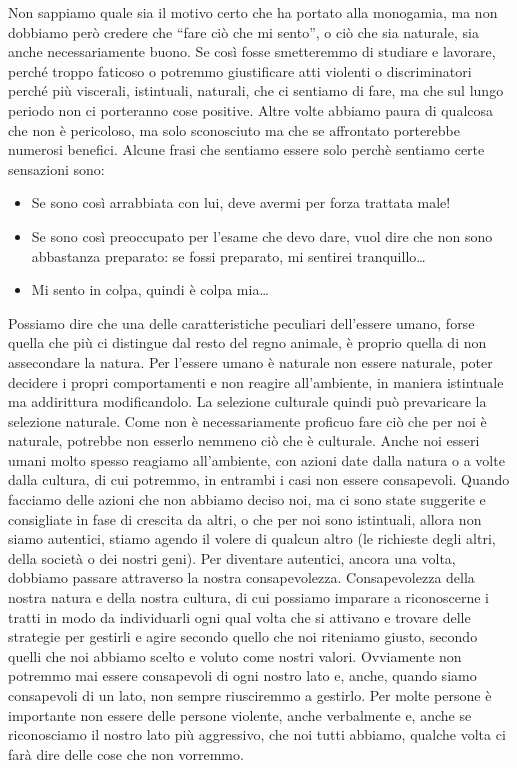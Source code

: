 \documentclass[12pt]{book} %
\begin{document}
Non sappiamo quale sia il motivo certo che ha portato alla monogamia, ma non dobbiamo però
credere che “fare ciò che mi sento”, o ciò che sia naturale, sia anche necessariamente buono. Se
così fosse smetteremmo di studiare e lavorare, perché troppo faticoso o potremmo giustificare atti violenti o
discriminatori perché più viscerali, istintuali, naturali, che ci sentiamo di fare,
ma che sul lungo periodo non ci porteranno cose positive. Altre volte abbiamo paura di qualcosa che non è
pericoloso, ma solo sconosciuto ma che se affrontato porterebbe numerosi benefici. 
Alcune frasi che sentiamo essere solo perchè sentiamo certe sensazioni sono:
\begin{itemize}
\item Se sono così arrabbiata con lui, deve avermi per forza trattata male! 
\item Se sono così preoccupato per l'esame che devo dare, vuol dire che non sono abbastanza preparato: se fossi preparato, mi sentirei tranquillo…
\item Mi sento in colpa, quindi è colpa mia…
\end{itemize}

Possiamo dire che una delle caratteristiche peculiari dell'essere umano, forse quella che più ci
distingue dal resto del regno animale, è proprio quella di non assecondare la natura. Per l'essere
umano è naturale non essere naturale, poter decidere i propri comportamenti e non reagire
all'ambiente, in maniera istintuale ma addirittura modificandolo. La selezione culturale quindi
può prevaricare la selezione naturale. Come non è necessariamente proficuo fare ciò che per noi è naturale, potrebbe non esserlo
nemmeno ciò che è culturale. Anche noi esseri umani molto spesso reagiamo
all'ambiente, con azioni date dalla natura o a volte dalla cultura, di cui potremmo, in entrambi i
casi non essere consapevoli. Quando facciamo delle azioni che non abbiamo deciso noi, ma ci sono state suggerite e
consigliate in fase di crescita da altri, o che per noi sono istintuali, allora non siamo autentici, stiamo agendo il
volere di qualcun altro (le richieste degli altri, della società o dei nostri geni). Per diventare autentici, ancora
una volta, dobbiamo passare attraverso la nostra consapevolezza. Consapevolezza della nostra natura e della nostra
cultura, di cui possiamo imparare a riconoscerne i tratti
in modo da individuarli ogni qual volta che si attivano e trovare delle strategie per gestirli e agire secondo quello
che noi riteniamo giusto, secondo quelli che noi abbiamo scelto e voluto come nostri valori. Ovviamente non potremmo
mai essere consapevoli di ogni nostro lato e, anche, quando siamo consapevoli di un lato, non sempre riusciremmo a gestirlo. Per
molte persone è importante non essere delle persone violente, anche verbalmente e, anche se riconosciamo il nostro lato
più aggressivo, che noi tutti abbiamo, qualche volta ci farà dire delle cose che non vorremmo.
\end{document}
